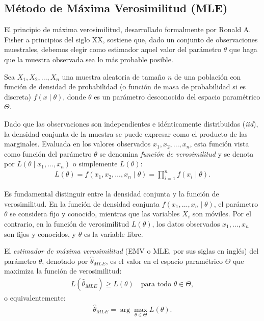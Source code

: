 \subsection{Método de Máxima Verosimilitud (MLE)}

El principio de máxima verosimilitud, desarrollado formalmente por Ronald A. Fisher a principios del siglo XX, sostiene que, dado un conjunto de observaciones muestrales, debemos elegir como estimador aquel valor del parámetro $\theta$ que haga que la muestra observada sea lo más probable posible.

\begin{definicion}
	Sea $X_1, X_2, \ldots, X_n$ una muestra aleatoria de tamaño $n$ de una población con función de densidad de probabilidad (o función de masa de probabilidad si es discreta) $f(x \mid \theta)$, donde $\theta$ es un parámetro desconocido del espacio paramétrico $\Theta$.

	Dado que las observaciones son independientes e idénticamente distribuidas (\emph{iid}), la densidad conjunta de la muestra se puede expresar como el producto de las marginales. Evaluada en los valores observados $x_1, x_2, \ldots, x_n$, esta función vista como función del parámetro $\theta$ se denomina \emph{función de verosimilitud} y se denota por $L(\theta \mid x_1, \ldots, x_n)$ o simplemente $L(\theta)$:
	\begin{align}
		L(\theta) = f(x_1, x_2, \ldots, x_n \mid \theta) = \prod_{i=1}^n f(x_i \mid \theta).
		\label{eq:verosimilitud_def}
	\end{align}
\end{definicion}

\begin{observacion}
	Es fundamental distinguir entre la densidad conjunta y la función de verosimilitud. En la función de densidad conjunta $f(x_1, \ldots, x_n \mid \theta)$, el parámetro $\theta$ se considera fijo y conocido, mientras que las variables $X_i$ son móviles. Por el contrario, en la función de verosimilitud $L(\theta)$, los datos observados $x_1, \ldots, x_n$ son fijos y conocidos, y $\theta$ es la variable libre.
\end{observacion}

\begin{definicion}
	El \emph{estimador de máxima verosimilitud} (EMV o MLE, por sus siglas en inglés) del parámetro $\theta$, denotado por $\hat{\theta}_{MLE}$, es el valor en el espacio paramétrico $\Theta$ que maximiza la función de verosimilitud:
	\begin{align}
		L(\hat{\theta}_{MLE}) \geq L(\theta) \quad \text{para todo } \theta \in \Theta,
	\end{align}
	o equivalentemente:
	\begin{align}
		\hat{\theta}_{MLE} = \arg\max_{\theta \in \Theta} L(\theta).
	\end{align}
\end{definicion}

